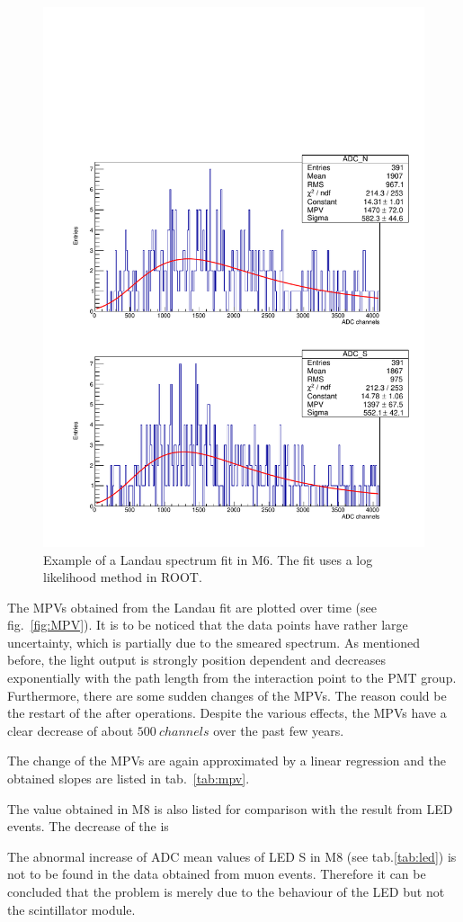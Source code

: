 \begin{figure}[ht]
  \centering
  \includegraphics[width=0.5\textwidth{}]{./fig/LandauFitM6.pdf}
  \caption{Example of a Landau spectrum fit in M6. The fit uses a log likelihood method in ROOT.}
  \label{fig:Landau_M6}
\end{figure}

The MPVs obtained from the Landau fit are plotted over time (see fig.\ \ref{fig:MPV}). It is to be noticed that the data points have rather large uncertainty, which is partially due to the smeared spectrum. As mentioned before, the light output is strongly position dependent and decreases exponentially with the path length from the interaction point to the PMT group. Furthermore, there are some sudden changes of the MPVs. The reason could be the restart of the \mvs{} after operations.
Despite the various effects, the MPVs have a clear decrease of about $\SI{500}{channels}$ over the past few years.

The change of the MPVs are again approximated by a linear regression and the obtained slopes are listed in tab.\ \ref{tab:mpv}.

The value obtained in M8 is also listed for comparison with the result from LED events. The decrease of the  is

The abnormal increase of ADC mean values of LED S in M8 (see tab.\ref{tab:led}) is not to be found in the data obtained from muon events. Therefore it can be concluded that the problem is merely due to the behaviour of the LED but not the scintillator module.


